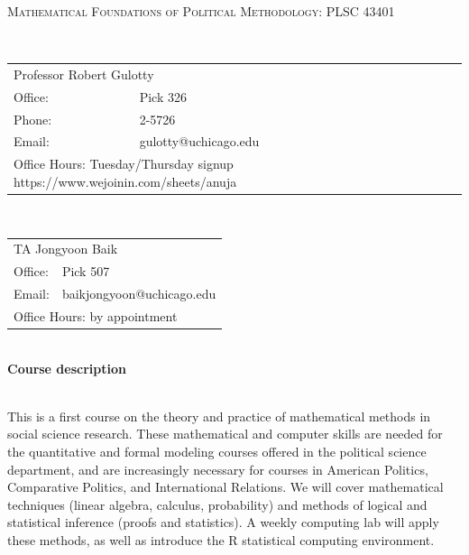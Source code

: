 \documentclass[11pt]{article}
\begin{document}
\begin{center}

\large
\textsc{Mathematical Foundations of Political Methodology: PLSC 43401}\\
\end{center}

\small

\ \\ \begin{tabular} {ll} \multicolumn{2}{l}{Professor Robert Gulotty}\\
Office: &Pick 326\\
Phone: &2-5726\\
Email: &gulotty@uchicago.edu\\
\multicolumn{2}{l}{Office Hours: Tuesday/Thursday signup https://www.wejoinin.com/sheets/anuja}
\end{tabular}

\vspace{.15in}
\vspace{.15in}

\ \\ \begin{tabular} {ll} \multicolumn{2}{l}{TA Jongyoon Baik}\\
Office: & Pick 507 \\
Email: &baikjongyoon@uchicago.edu  \\
\multicolumn{2}{l}{Office Hours: by appointment }
\end{tabular}

\vspace{.5in}

\ \\{\bf Course description}  

\ \\This is a first course on the theory and practice of mathematical methods in social science research.  These mathematical and computer skills are needed for the quantitative and formal modeling courses offered in the political science department, and are increasingly necessary for courses in American Politics, Comparative Politics, and International Relations.   We will cover mathematical techniques (linear algebra, calculus, probability) and methods of logical and statistical inference (proofs and statistics).  A weekly computing lab will apply these methods, as well as introduce the R statistical computing environment.

\vspace{.1in}
\end{document}
